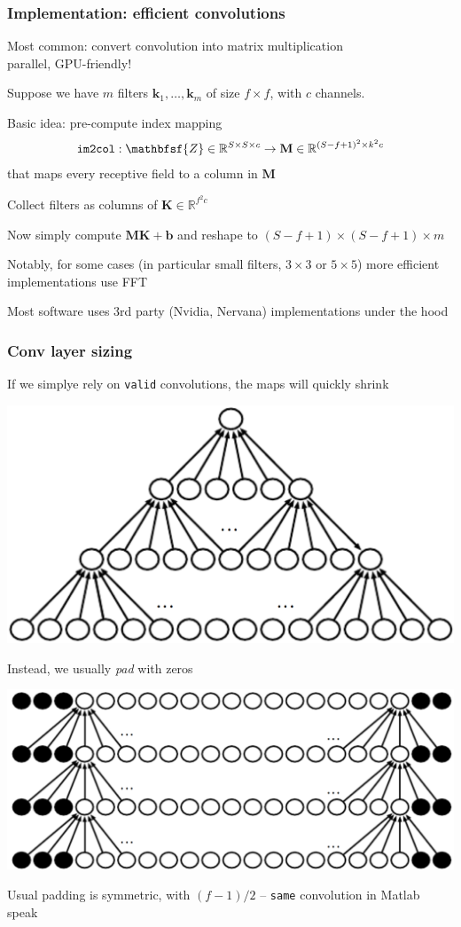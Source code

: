 \documentclass[xcolor=dvipsnames]{beamer}
\begin{document}
\begin{frame}
  \frametitle{Implementation: efficient convolutions}
  \bi
\item Most common: convert convolution into matrix multiplication\\
parallel, GPU-friendly!
\item Suppose we have $m$ filters $\mathbf{k}_1,\ldots,\mathbf{k}_m$ of size $f\times f$, with
  $c$ channels.
\item Basic idea: pre-compute index mapping 
\[\texttt{im2col}:\mathbfsf{Z}\in\mathbb{R}^{S\times S\times
  c}\to\mathbf{M}\in\mathbb{R}^{(S-f+1)^2\times k^2c}\]
that maps every receptive field to a column in $\mathbf{M}$
\item Collect filters as columns of $\mathbf{K}\in\mathbb{R}^{f^2c}$
\item Now simply compute $\mathbf{M}\mathbf{K}+\mathbf{b}$ and reshape to
  $(S-f+1)\times (S-f+1)\times m$
\item Notably, for some cases (in particular small filters, $3\times
  3$ or $5\times 5$) more efficient implementations use FFT
\item Most software uses 3rd party (Nvidia, Nervana) implementations
  under the hood
\ei
\end{frame}


\begin{frame}
  \frametitle{Conv layer sizing}
\bi
\item If we simplye rely on {\tt valid} convolutions, the maps will
  quickly shrink

\includegraphics[width=.4\textwidth]{gcb-conv-nopad}\raisebox{1em}{[Goodfellow
et al]}

\item Instead, we usually \emph{pad} with zeros

\includegraphics[width=.5\textwidth]{gcb-conv-pad}\raisebox{1em}{[Goodfellow
et al]}
\item Usual padding is symmetric, with $(f-1)/2$ -- {\tt same}
  convolution in Matlab speak
\ei  
\end{frame}
\end{document}
